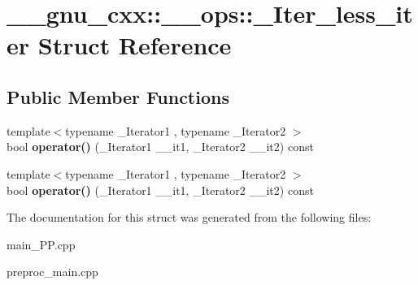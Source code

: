 \hypertarget{struct____gnu__cxx_1_1____ops_1_1__Iter__less__iter}{\section{\+\_\+\+\_\+gnu\+\_\+cxx\+:\+:\+\_\+\+\_\+ops\+:\+:\+\_\+\+Iter\+\_\+less\+\_\+iter Struct Reference}
\label{struct____gnu__cxx_1_1____ops_1_1__Iter__less__iter}
}
\subsection*{Public Member Functions}
\begin{DoxyCompactItemize}
\item 
\hypertarget{struct____gnu__cxx_1_1____ops_1_1__Iter__less__iter_a8879ba83c9aa867a2885f81d85f62b3f}{{\footnotesize template$<$typename \+\_\+\+Iterator1 , typename \+\_\+\+Iterator2 $>$ }\\bool {\bfseries operator()} (\+\_\+\+Iterator1 \+\_\+\+\_\+it1, \+\_\+\+Iterator2 \+\_\+\+\_\+it2) const }\label{struct____gnu__cxx_1_1____ops_1_1__Iter__less__iter_a8879ba83c9aa867a2885f81d85f62b3f}

\item 
\hypertarget{struct____gnu__cxx_1_1____ops_1_1__Iter__less__iter_a8879ba83c9aa867a2885f81d85f62b3f}{{\footnotesize template$<$typename \+\_\+\+Iterator1 , typename \+\_\+\+Iterator2 $>$ }\\bool {\bfseries operator()} (\+\_\+\+Iterator1 \+\_\+\+\_\+it1, \+\_\+\+Iterator2 \+\_\+\+\_\+it2) const }\label{struct____gnu__cxx_1_1____ops_1_1__Iter__less__iter_a8879ba83c9aa867a2885f81d85f62b3f}

\end{DoxyCompactItemize}


The documentation for this struct was generated from the following files\+:\begin{DoxyCompactItemize}
\item 
main\+\_\+\+P\+P.\+cpp\item 
preproc\+\_\+main.\+cpp\end{DoxyCompactItemize}
